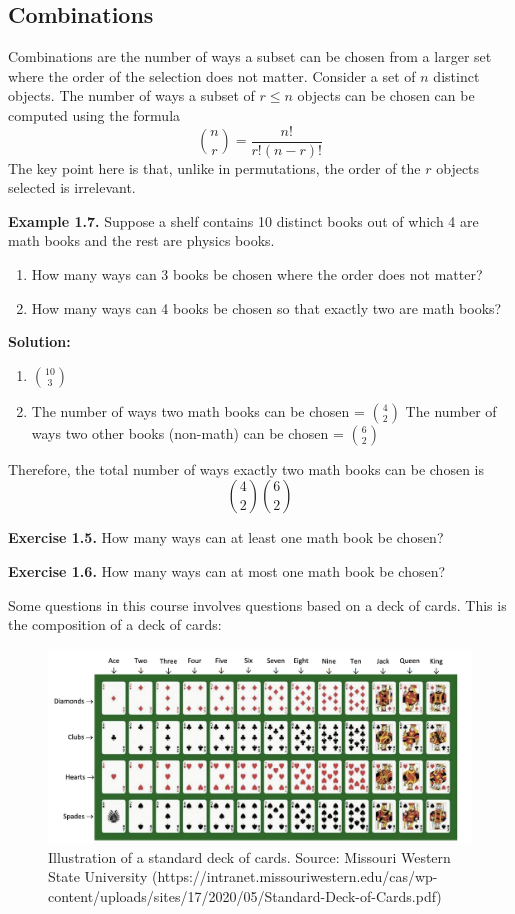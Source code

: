 \documentclass[
  12pt,
]{krantzNoCorner}
\begin{document}
\hypertarget{combinations}{%
\subsection{Combinations}\label{combinations}}

Combinations are the number of ways a subset can be chosen from a larger
set where the order of the selection does not matter. Consider a set of
\(n\) distinct objects. The number of ways a subset of \(r\leq n\) objects
can be chosen can be computed using the formula
\[{n\choose r} = \frac{n!}{r!(n-r)!}\] The key point here is that,
unlike in permutations, the order of the \(r\) objects selected is
irrelevant.

\textbf{Example 1.7.} Suppose a shelf contains 10 distinct books out of which
4 are math books and the rest are physics books.

\begin{enumerate}
\def\labelenumi{\arabic{enumi}.}
\item
  How many ways can 3 books be chosen where the order does not matter?
\item
  How many ways can 4 books be chosen so that exactly two are math
  books?
\end{enumerate}

\textbf{Solution:}

\begin{enumerate}
\def\labelenumi{\arabic{enumi}.}
\item
  \(10\choose 3\)
\item
  The number of ways two math books can be chosen = \(4\choose 2\) The
  number of ways two other books (non-math) can be chosen =
  \(6\choose 2\)
\end{enumerate}

Therefore, the total number of ways exactly two math books can be chosen
is \[{4\choose 2}{6\choose 2}\]

\textbf{Exercise 1.5.} How many ways can at least one math book be chosen?

\textbf{Exercise 1.6.} How many ways can at most one math book be chosen?

Some questions in this course involves questions based on a deck of
cards. This is the composition of a deck of cards:

\begin{figure}
\includegraphics[width=0.9\linewidth,height=0.4\textheight]{deckofcards} \caption{Illustration of a standard deck of cards. Source: Missouri Western State University (https://intranet.missouriwestern.edu/cas/wp-content/uploads/sites/17/2020/05/Standard-Deck-of-Cards.pdf)}\label{fig:ExCardDeck}
\end{figure}
\end{document}
